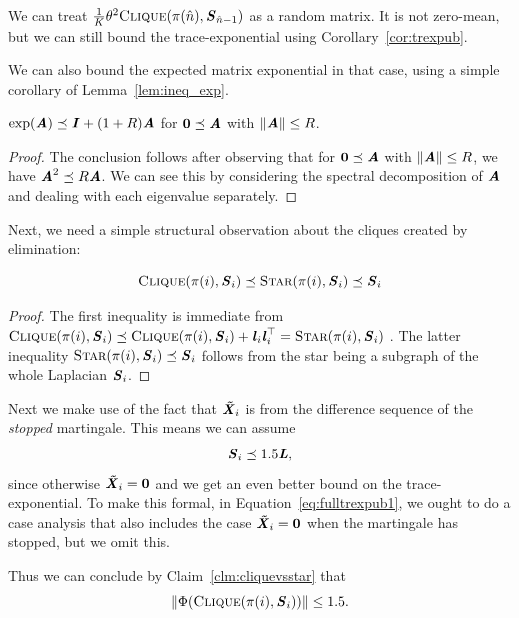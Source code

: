 We can treat
$\frac{1}{K}\theta^2\vcliq{\pi(\hat{n})}{\SS_{\hat{n}-1}}$ as a random
matrix.
It is not zero-mean, but we can still bound the trace-exponential
using Corollary~\ref{cor:trexpub}.

We can also bound the expected matrix exponential in
that case, using a simple corollary of Lemma~\ref{lem:ineq_exp}.
\begin{corollary}\label{cor:ineq_exp_cher}
  $\exp(\AA) \preceq \II + (1+R)\AA $
  for $\matzero \preceq \AA$ with $\norm{\AA} \leq R$.
\end{corollary}
\begin{proof}
  The conclusion follows after observing that for $\matzero \preceq \AA$ with $\norm{\AA} \leq R$,
  we have $\AA^2 \preceq R \AA$.
  We can see this by considering the spectral decomposition of $\AA$
  and dealing with each eigenvalue separately.
\end{proof}

Next, we need a simple structural observation about the cliques
created by elimination:
\begin{claim}
  \label{clm:cliquevsstar}
  \[
    \vcliq{\pi(i)}{\SS_i} \preceq \vstar{\pi(i)}{\SS_i} \preceq \SS_i
  \]
\end{claim}
\begin{proof}
  The first inequality is immediate from
  $
     \vcliq{\pi(i)}{\SS_i} \preceq   \vcliq{\pi(i)}{\SS_i} + \ll_i\ll_i^\trp
     =
     \vstar{\pi(i)}{\SS_i}
   $
   .
   The latter inequality $\vstar{\pi(i)}{\SS_i} \preceq \SS_i$
  follows from the star being a subgraph of the whole Laplacian $\SS_i$.
\end{proof}

Next we make use of the fact that $\XXtil_{i}$ is from the
difference sequence of the \emph{stopped} martingale.
This means we can assume
\[
  \SS_{i} \preceq 1.5 \LL,
\]
since
otherwise $\XXtil_{i} = \matzero$ and we get an even better
bound on the trace-exponential.
To make this formal, in Equation~\eqref{eq:fulltrexpub1},
we ought to do a case analysis that also includes
the case $\XXtil_{i} = \matzero$ when the martingale has
stopped, but we omit this.

Thus we can conclude by Claim~\ref{clm:cliquevsstar} that
\[
  \norm{\Phi(\vcliq{\pi(i)}{\SS_{i}})} \leq 1.5.
\]

